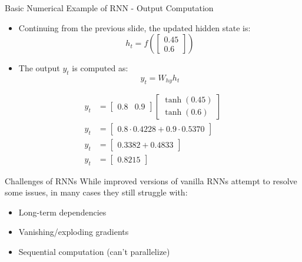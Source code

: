 \documentclass[serif, aspectratio=169]{beamer}
\begin{document}
\begin{frame}{Basic Numerical Example of RNN - Output Computation}
	\begin{itemize}
		\item Continuing from the previous slide, the updated hidden state is:
		\[
		h_t = f\left(\begin{bmatrix} 0.45 \\ 0.6 \end{bmatrix}\right)
		\]
		\item The output \( y_t \) is computed as:
		\[
		y_t = W_{hy} h_t
		\]
	\end{itemize}
	\vspace{-15pt}
	\begin{align*}
		y_t &= \begin{bmatrix} 0.8 & 0.9 \end{bmatrix} \begin{bmatrix} \tanh(0.45) \\ \tanh(0.6) \end{bmatrix} \\
		y_t &= \begin{bmatrix} 0.8 \cdot 0.4228 + 0.9 \cdot 0.5370 \end{bmatrix} \\
		y_t &= \begin{bmatrix} 0.3382 + 0.4833 \end{bmatrix} \\
		y_t &= \begin{bmatrix} 0.8215 \end{bmatrix}
	\end{align*}
\end{frame}

\begin{frame}{Challenges of RNNs}
		While improved versions of vanilla RNNs attempt to resolve some issues, in many cases they still struggle with:
		\begin{itemize}
			\item Long-term dependencies
			\item Vanishing/exploding gradients
			\item Sequential computation (can't parallelize)
		\end{itemize}
\end{frame}
\end{document}
